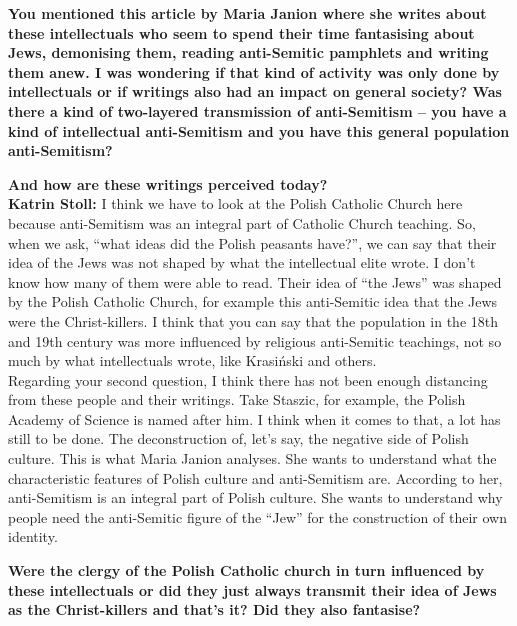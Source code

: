 \textbf{You mentioned this article by Maria Janion where she writes about these intellectuals who seem to spend their time fantasising about Jews, demonising them, reading anti-Semitic pamphlets and writing them anew. I was wondering if that kind of activity was only done by intellectuals or if writings also had an impact on general society? Was there a kind of two-layered transmission of anti-Semitism – you have a kind of intellectual anti-Semitism and you have this general population anti-Semitism?}\par
\textbf{And how are these writings perceived today?}\\ 

\textbf{Katrin Stoll:} I think we have to look at the Polish Catholic Church here because anti-Semitism was an integral part of Catholic Church teaching. So, when we ask, ``what ideas did the Polish peasants have?'', we can say that their idea of the Jews was not shaped by what the intellectual elite wrote. I don’t know how many of them were able to read. Their idea of ``the Jews'' was shaped by the Polish Catholic Church, for example this anti-Semitic idea that the Jews were the Christ-killers. I think that you can say that the population in the 18th and 19th century was more influenced by religious anti-Semitic teachings, not so much by what intellectuals wrote, like Krasiński and others.\\ 
Regarding your second question, I think there has not been enough distancing from these people and their writings. Take Staszic, for example, the Polish Academy of Science is named after him. I think when it comes to that, a lot has still to be done. The deconstruction of, let’s say, the negative side of Polish culture. This is what Maria Janion analyses. She wants to understand what the characteristic features of Polish culture and anti-Semitism are. According to her, anti-Semitism is an integral part of Polish culture. She wants to understand why people need the anti-Semitic figure of the ``Jew'' for the construction of their own identity. 

\textbf{Were the clergy of the Polish Catholic church in turn influenced by these intellectuals or did they just always transmit their idea of Jews as the Christ-killers and that’s it? Did they also fantasise?}

